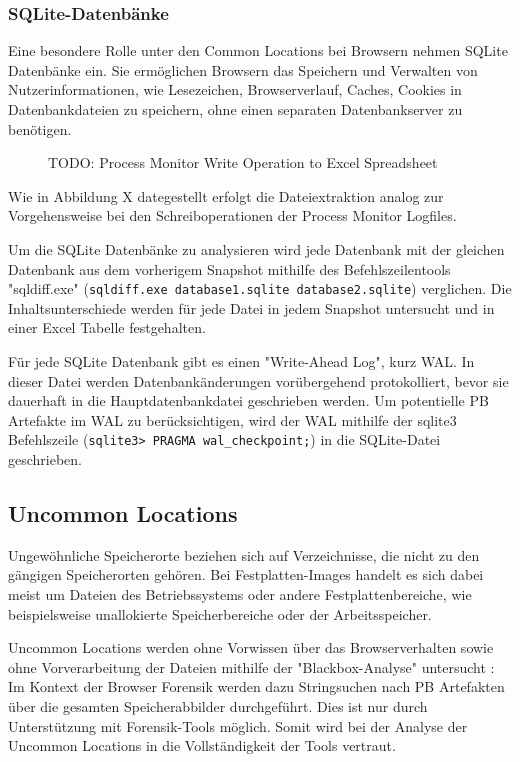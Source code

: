 \subsubsection*{SQLite-Datenbänke}

Eine besondere Rolle unter den Common Locations bei Browsern nehmen SQLite Datenbänke ein. 
Sie ermöglichen Browsern das Speichern und Verwalten von Nutzerinformationen, wie Lesezeichen, Browserverlauf, Caches, Cookies in Datenbankdateien zu speichern, ohne einen separaten Datenbankserver zu benötigen.

\begin{figure}[h!]
	\centering
	\small
	\centerline{\resizebox{\linewidth}{!}{}}
	\caption{TODO: Process Monitor Write Operation to Excel Spreadsheet}
	\label{fig:jes}
\end{figure}
Wie in Abbildung X dategestellt erfolgt die Dateiextraktion analog zur Vorgehensweise bei den Schreiboperationen der Process Monitor Logfiles.

Um die SQLite Datenbänke zu analysieren wird jede Datenbank mit der gleichen Datenbank aus dem vorherigem Snapshot mithilfe des Befehlszeilentools "sqldiff.exe" (\texttt{sqldiff.exe database1.sqlite database2.sqlite}) verglichen. Die Inhaltsunterschiede werden für jede Datei in jedem Snapshot untersucht und in einer Excel Tabelle festgehalten.

Für jede SQLite Datenbank gibt es einen "Write-Ahead Log", kurz WAL. In dieser Datei werden Datenbankänderungen vorübergehend protokolliert, bevor sie dauerhaft in die Hauptdatenbankdatei geschrieben werden. 
Um potentielle PB Artefakte im WAL zu berücksichtigen, wird der WAL mithilfe der sqlite3 Befehlszeile (\texttt{sqlite3> PRAGMA wal\_checkpoint;}) in die SQLite-Datei geschrieben.

\subsection{Uncommon Locations}
Ungewöhnliche Speicherorte beziehen sich auf Verzeichnisse, die nicht zu den gängigen Speicherorten gehören. 
Bei Festplatten-Images handelt es sich dabei meist um Dateien des Betriebssystems oder andere Festplattenbereiche, wie beispielsweise unallokierte Speicherbereiche oder der Arbeitsspeicher.

Uncommon Locations werden ohne Vorwissen über das Browserverhalten sowie ohne Vorverarbeitung der Dateien mithilfe der "Blackbox-Analyse" untersucht \cite{Bonetti.2014}:
Im Kontext der Browser Forensik werden dazu Stringsuchen nach PB Artefakten über die gesamten Speicherabbilder durchgeführt.
Dies ist nur durch Unterstützung mit Forensik-Tools möglich. Somit wird bei der Analyse der Uncommon Locations in die Vollständigkeit der Tools vertraut.

